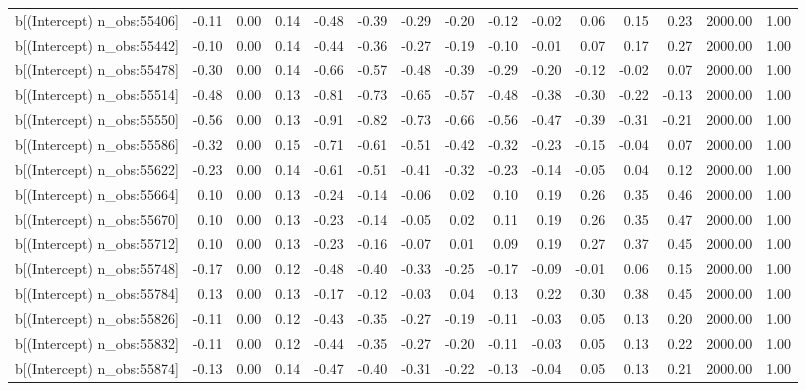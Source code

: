 \begin{table}[ht]
\begin{tabular}{rrrrrrrrrrrrrrr}
  b[(Intercept) n\_obs:55406] & -0.11 & 0.00 & 0.14 & -0.48 & -0.39 & -0.29 & -0.20 & -0.12 & -0.02 & 0.06 & 0.15 & 0.23 & 2000.00 & 1.00 \\ 
  b[(Intercept) n\_obs:55442] & -0.10 & 0.00 & 0.14 & -0.44 & -0.36 & -0.27 & -0.19 & -0.10 & -0.01 & 0.07 & 0.17 & 0.27 & 2000.00 & 1.00 \\ 
  b[(Intercept) n\_obs:55478] & -0.30 & 0.00 & 0.14 & -0.66 & -0.57 & -0.48 & -0.39 & -0.29 & -0.20 & -0.12 & -0.02 & 0.07 & 2000.00 & 1.00 \\ 
  b[(Intercept) n\_obs:55514] & -0.48 & 0.00 & 0.13 & -0.81 & -0.73 & -0.65 & -0.57 & -0.48 & -0.38 & -0.30 & -0.22 & -0.13 & 2000.00 & 1.00 \\ 
  b[(Intercept) n\_obs:55550] & -0.56 & 0.00 & 0.13 & -0.91 & -0.82 & -0.73 & -0.66 & -0.56 & -0.47 & -0.39 & -0.31 & -0.21 & 2000.00 & 1.00 \\ 
  b[(Intercept) n\_obs:55586] & -0.32 & 0.00 & 0.15 & -0.71 & -0.61 & -0.51 & -0.42 & -0.32 & -0.23 & -0.15 & -0.04 & 0.07 & 2000.00 & 1.00 \\ 
  b[(Intercept) n\_obs:55622] & -0.23 & 0.00 & 0.14 & -0.61 & -0.51 & -0.41 & -0.32 & -0.23 & -0.14 & -0.05 & 0.04 & 0.12 & 2000.00 & 1.00 \\ 
  b[(Intercept) n\_obs:55664] & 0.10 & 0.00 & 0.13 & -0.24 & -0.14 & -0.06 & 0.02 & 0.10 & 0.19 & 0.26 & 0.35 & 0.46 & 2000.00 & 1.00 \\ 
  b[(Intercept) n\_obs:55670] & 0.10 & 0.00 & 0.13 & -0.23 & -0.14 & -0.05 & 0.02 & 0.11 & 0.19 & 0.26 & 0.35 & 0.47 & 2000.00 & 1.00 \\ 
  b[(Intercept) n\_obs:55712] & 0.10 & 0.00 & 0.13 & -0.23 & -0.16 & -0.07 & 0.01 & 0.09 & 0.19 & 0.27 & 0.37 & 0.45 & 2000.00 & 1.00 \\ 
  b[(Intercept) n\_obs:55748] & -0.17 & 0.00 & 0.12 & -0.48 & -0.40 & -0.33 & -0.25 & -0.17 & -0.09 & -0.01 & 0.06 & 0.15 & 2000.00 & 1.00 \\ 
  b[(Intercept) n\_obs:55784] & 0.13 & 0.00 & 0.13 & -0.17 & -0.12 & -0.03 & 0.04 & 0.13 & 0.22 & 0.30 & 0.38 & 0.45 & 2000.00 & 1.00 \\ 
  b[(Intercept) n\_obs:55826] & -0.11 & 0.00 & 0.12 & -0.43 & -0.35 & -0.27 & -0.19 & -0.11 & -0.03 & 0.05 & 0.13 & 0.20 & 2000.00 & 1.00 \\ 
  b[(Intercept) n\_obs:55832] & -0.11 & 0.00 & 0.12 & -0.44 & -0.35 & -0.27 & -0.20 & -0.11 & -0.03 & 0.05 & 0.13 & 0.22 & 2000.00 & 1.00 \\ 
  b[(Intercept) n\_obs:55874] & -0.13 & 0.00 & 0.14 & -0.47 & -0.40 & -0.31 & -0.22 & -0.13 & -0.04 & 0.05 & 0.13 & 0.21 & 2000.00 & 1.00 \\ 

\end{tabular}
\end{table}
